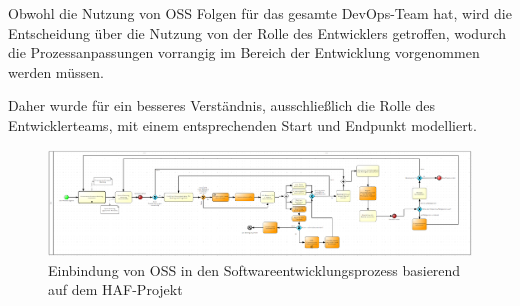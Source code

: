 Obwohl die Nutzung von OSS Folgen für das gesamte DevOps-Team hat, wird die Entscheidung über die Nutzung von der Rolle des Entwicklers getroffen, wodurch die Prozessanpassungen  vorrangig im Bereich der Entwicklung vorgenommen werden müssen. 

Daher wurde für ein besseres Verständnis, ausschließlich die Rolle des Entwicklerteams, mit einem entsprechenden Start und Endpunkt modelliert. 

\begin{figure}[p]
    \centering
    \includegraphics[angle=90, scale=0.7]{Bilder/SOLL-Prozess.png}
    \caption{Einbindung von OSS in den Softwareentwicklungsprozess basierend auf dem HAF-Projekt}
\end{figure}